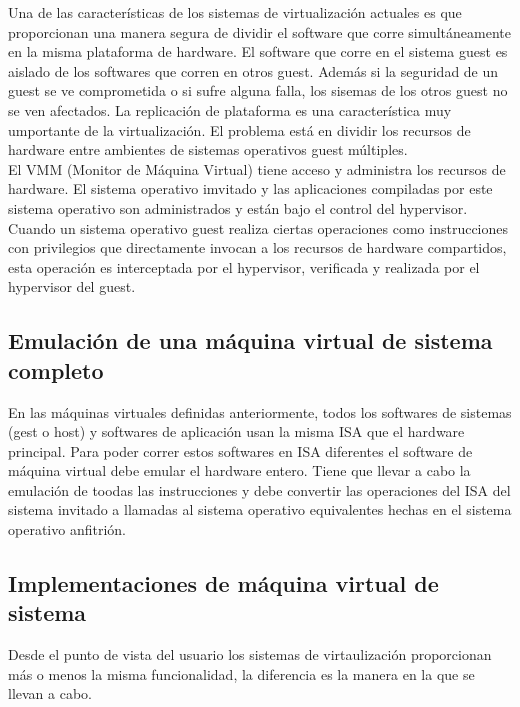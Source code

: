 \documentclass[10pt,a4paper,spanish]{report}
\begin{document}
  \noindent
  Una de las características de los sistemas de virtualización actuales es que proporcionan una manera segura de dividir el software que corre simultáneamente en la misma plataforma de hardware. El software que corre en el sistema guest es aislado de los softwares que corren en otros guest. Además si la seguridad de un guest se ve comprometida o si sufre alguna falla, los sisemas de los otros guest no se ven afectados. La replicación de plataforma es una característica muy umportante de la virtualización. El problema está en dividir los recursos de hardware entre ambientes de sistemas operativos guest múltiples.\\

  \noindent
  El VMM (Monitor de Máquina Virtual) tiene acceso y administra los recursos de hardware. El sistema operativo imvitado y las aplicaciones compiladas por este sistema operativo son administrados y están bajo el control del hypervisor. Cuando un sistema operativo guest realiza ciertas operaciones como instrucciones con privilegios que directamente invocan a los recursos de hardware compartidos, esta operación es interceptada por el hypervisor, verificada y realizada por el hypervisor del guest.


  \subsection{Emulación de una máquina virtual de sistema completo}

  \noindent
  En las máquinas virtuales definidas anteriormente, todos los softwares de sistemas (gest o host) y softwares de aplicación usan la misma ISA que el hardware principal. Para poder correr estos softwares en ISA diferentes el software de máquina virtual debe emular el hardware entero. Tiene que llevar a cabo la emulación de toodas las instrucciones y debe convertir las operaciones del ISA del sistema invitado a llamadas al sistema operativo equivalentes hechas en el sistema operativo anfitrión.

  \subsection{Implementaciones de máquina virtual de sistema}

  \noindent
  Desde el punto de vista del usuario los sistemas de virtaulización proporcionan más o menos la misma funcionalidad, la diferencia es la manera en la que se llevan a cabo. \\
\end{document}
